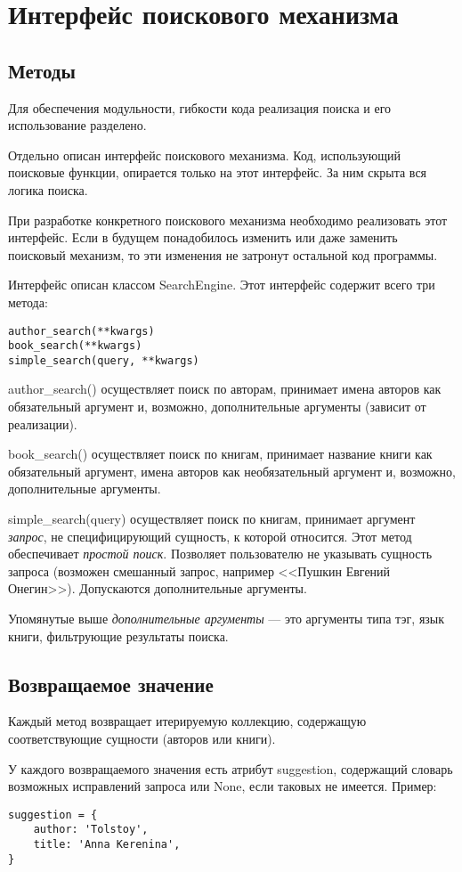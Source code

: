 \section{Интерфейс поискового механизма}

\subsection{Методы}


Для обеспечения модульности, гибкости кода реализация поиска и его использование разделено.

Отдельно описан интерфейс поискового механизма. Код, использующий поисковые функции, опирается только на этот интерфейс. За ним скрыта вся логика поиска.

При разработке конкретного поискового механизма необходимо реализовать этот интерфейс. Если в будущем понадобилось изменить или даже заменить поисковый механизм, то эти изменения не затронут остальной код программы.

Интерфейс описан классом SearchEngine.
Этот интерфейс содержит всего три метода:
\begin{verbatim}
author_search(**kwargs)
book_search(**kwargs)
simple_search(query, **kwargs)
\end{verbatim}


author\_search() осуществляет поиск по авторам, принимает имена авторов как обязательный аргумент и, возможно, дополнительные аргументы (зависит от реализации).

book\_search() осуществляет поиск по книгам, принимает название книги как обязательный аргумент, имена авторов как необязательный аргумент и, возможно, дополнительные аргументы. 

simple\_search(query) осуществляет поиск по книгам, принимает аргумент {\em запрос}, не специфицирующий сущность, к которой относится.
Этот метод обеспечивает {\em простой поиск}.
Позволяет пользователю не указывать сущность запроса (возможен смешанный запрос, например <<Пушкин Евгений Онегин>>). Допускаются дополнительные аргументы. 

Упомянутые выше {\em дополнительные аргументы} --- это аргументы типа тэг, язык книги, фильтрующие результаты поиска. 


\subsection{Возвращаемое значение}

Каждый метод возвращает итерируемую коллекцию, содержащую соответствующие сущности (авторов или книги). 

У каждого возвращаемого значения есть атрибут suggestion, содержащий словарь возможных исправлений запроса или None, если таковых не имеется. Пример: 
\begin{verbatim}
suggestion = {
    author: 'Tolstoy',
    title: 'Anna Kerenina',
}
\end{verbatim}
